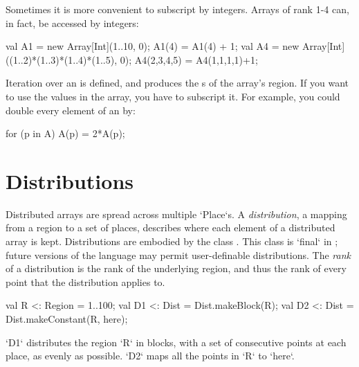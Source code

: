 Sometimes it is more convenient to subscript by integers.  Arrays of rank 1-4
can, in fact, be accessed by integers: 
\begin{xten}
val A1 = new Array[Int](1..10, 0);
A1(4) = A1(4) + 1;
val A4 = new Array[Int]((1..2)*(1..3)*(1..4)*(1..5), 0);
A4(2,3,4,5) = A4(1,1,1,1)+1;
\end{xten}



Iteration over an  is defined, and produces the s of the
array's region.  If you want to use the values in the array, you have to
subscript it.  For example, you could double every element of an
 by: 
\begin{xten}
for (p in A) A(p) = 2*A(p);
\end{xten}



\section{Distributions}\label{XtenDistributions}

Distributed arrays are spread across multiple \xcd`Place`s.  
A {\em distribution}, a mapping from a region to a set of places, 
describes where each element of a distributed array is kept.
Distributions are embodied by the class .
This class is \xcd`final` in
{}\XtenCurrVer; future versions of the language may permit
user-definable distributions. 
The {\em rank} of a distribution is the rank of the underlying region, and
thus the rank of every point that the distribution applies to.



\begin{xten}
val R  <: Region = 1..100;
val D1 <: Dist = Dist.makeBlock(R);
val D2 <: Dist = Dist.makeConstant(R, here);
\end{xten}

\xcd`D1` distributes the region \xcd`R` in blocks, with a set of consecutive
points at each place, as evenly as possible.  \xcd`D2` maps all the points in
\xcd`R` to \xcd`here`.  


